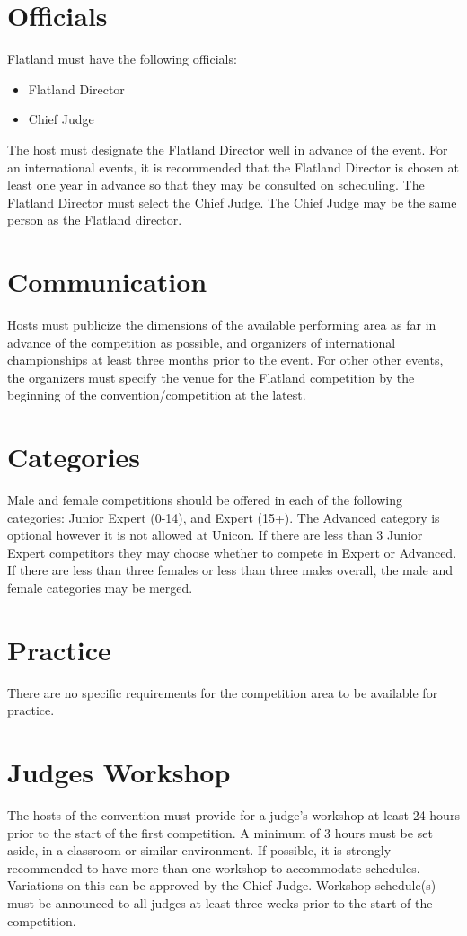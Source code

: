 \section{Officials}

Flatland must have the following officials:
\begin{itemize}
\item Flatland Director
\item Chief Judge
\end{itemize}

The host must designate the Flatland Director well in advance of the event.
For an international events, it is recommended that the Flatland Director is chosen at least one year in advance so that they may be consulted on scheduling.
The Flatland Director must select the Chief Judge.
The Chief Judge may be the same person as the Flatland director. 

\section{Communication}

Hosts must publicize the dimensions of the available performing area as far in advance of the competition as possible, and organizers of international championships at least three months prior to the event.
For other other events, the organizers must specify the venue for the Flatland competition by the beginning of the convention/competition at the latest.

\section{Categories}
Male and female competitions should be offered in each of the following categories: Junior Expert (0-14), and Expert (15+).
The Advanced category is optional however it is not allowed at Unicon.
If there are less than 3 Junior Expert competitors they may choose whether to compete in Expert or Advanced.
If there are less than three females or less than three males overall, the male and female categories may be merged.

\section{Practice}

There are no specific requirements for the competition area to be available for practice.

\section{Judges Workshop}
The hosts of the convention must provide for a judge's workshop at least 24 hours prior to the start of the first competition.
A minimum of 3 hours must be set aside, in a classroom or similar environment.
If possible, it is strongly recommended to have more than one workshop to accommodate schedules.
Variations on this can be approved by the Chief Judge.
Workshop schedule(s) must be announced to all judges at least three weeks prior to the start of the competition.
